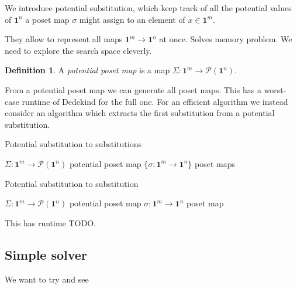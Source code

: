 \documentclass[11pt]{article}
\theoremstyle{definition}
\newtheorem{definition}{Definition}
\newcommand{\mname}[1]{\textit{{#1}}}
\newcommand{\pint}[1]{\mathbf{1}^{#1}}
\newcommand{\pow}[1]{\mathcal{P}({#1})}
\begin{document}
We introduce potential substitution, which keep track of all the potential
values of $\pint{n}$ a poset map $\sigma$ might assign to an element of $x \in \pint{m}$.

They allow to represent all maps $\pint{m} \to \pint{n}$ at once.
Solves memory problem. We need to explore the search space cleverly.

\begin{definition}
  A \mname{potential poset map} is a map $\Sigma : \pint{m} \to \pow{\pint{n}}$.
\end{definition}

From a potential poset map we can generate all poset maps. This has a worst-case
runtime of Dedekind for the full one. For an efficient algorithm we instead
consider an algorithm which extracts the first substitution from a potential
substitution. 


\begin{algorithm}[H]
  \caption{Potential substitution to substitutions}\label{alg:simple}
  \begin{algorithmic}
    \Require $\Sigma : \pint{m} \to \pow{\pint{n}}$ potential poset map
    \Ensure $\{ \sigma : \pint{m} \to \pint{n} \}$ poset maps
  \end{algorithmic}
\end{algorithm}


\begin{algorithm}[H]
  \caption{Potential substitution to substitution}\label{alg:simple}
  \begin{algorithmic}
    \Require $\Sigma : \pint{m} \to \pow{\pint{n}}$ potential poset map
    \Ensure $\sigma : \pint{m} \to \pint{n}$ poset map
  \end{algorithmic}
\end{algorithm}


This has runtime TODO.

\subsection{Simple solver}

We want to try and see 
\end{document}
